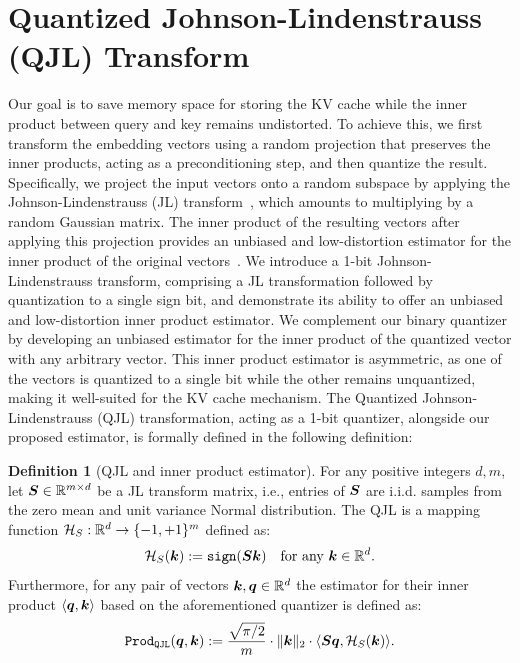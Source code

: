 \documentclass[11pt]{article}
\theoremstyle{plain}
\theoremstyle{definition}
\newtheorem{definition}[theorem]{Definition}
\theoremstyle{remark}
\newcommand{\prodqjl}{\operatorname{{\tt Prod_{QJL}}}}
\begin{document}


\section{Quantized Johnson-Lindenstrauss (QJL) Transform}
Our goal is to save memory space for storing the KV cache while the inner product between query and key remains undistorted. 
To achieve this, we first transform the embedding vectors using a random projection that preserves the inner products, acting as a preconditioning step, and then quantize the result. 
Specifically, we project the input vectors onto a random subspace by applying the Johnson-Lindenstrauss (JL) transform~\cite{johnson1986extensions}, which amounts to multiplying by a random Gaussian matrix. 
The inner product of the resulting vectors after applying this projection provides an unbiased and low-distortion estimator for the inner product of the original vectors~\cite{dasgupta2003elementary}.
We introduce a 1-bit Johnson-Lindenstrauss transform, comprising a JL transformation followed by quantization to a single sign bit, and demonstrate its ability to offer an unbiased and low-distortion inner product estimator. 
We complement our binary quantizer by developing an unbiased estimator for the inner product of the quantized vector with any arbitrary vector. 
This inner product estimator is asymmetric, as one of the vectors is quantized to a single bit while the other remains unquantized, making it well-suited for the KV cache mechanism.
The Quantized Johnson-Lindenstrauss (QJL) transformation, acting as a 1-bit quantizer, alongside our proposed estimator, is formally defined in the following definition:
\begin{definition}[QJL and inner product estimator]\label{def:asym_hash}
    For any positive integers $d, m$, let $\S \in \RR^{m \times d}$ be a JL transform matrix, i.e., entries of $\S$ are i.i.d. samples from the zero mean and unit variance Normal distribution. The QJL is a mapping function $\Hc_S: \RR^d \to \{-1, +1\}^m$ defined as:
    \begin{equation}
    \Hc_S(\k) := {\tt sign}(\S \k) ~~\text{ for any } \k \in \RR^d.
    \end{equation}
    Furthermore, for any pair of vectors $\k, \q \in \RR^d$ the estimator for their inner product $\langle \q, \k \rangle$ based on the aforementioned quantizer is defined as:
    \begin{equation}\label{prod_est}
    \prodqjl(\q, \k) := \frac{\sqrt{\pi/2}}{m} \cdot \| \k \|_2 \cdot \langle \S\q, \Hc_S(\k) \rangle.
    \end{equation}
\end{definition}
\end{document}
